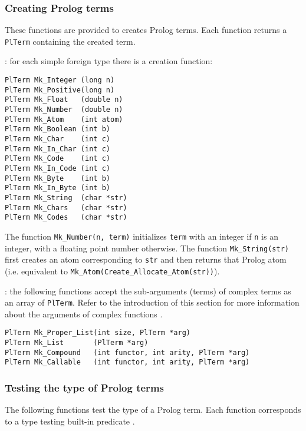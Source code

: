 \subsubsection{Creating Prolog terms}
\label{Creating-Prolog-terms}
These functions are provided to creates Prolog terms. Each function returns
a \texttt{PlTerm} containing the created term.

: for each simple foreign type
 there is a creation function:

\begin{Indentation}
\begin{verbatim}
PlTerm Mk_Integer (long n)
PlTerm Mk_Positive(long n)
PlTerm Mk_Float   (double n)
PlTerm Mk_Number  (double n)
PlTerm Mk_Atom    (int atom)
PlTerm Mk_Boolean (int b)
PlTerm Mk_Char    (int c)
PlTerm Mk_In_Char (int c)
PlTerm Mk_Code    (int c)
PlTerm Mk_In_Code (int c)
PlTerm Mk_Byte    (int b)
PlTerm Mk_In_Byte (int b)
PlTerm Mk_String  (char *str)
PlTerm Mk_Chars   (char *str)
PlTerm Mk_Codes   (char *str)
\end{verbatim}
\end{Indentation}

The function \texttt{Mk\_Number(n, term)} initializes \texttt{term} with an
integer if \texttt{n} is an integer, with a floating point number otherwise.
The function \texttt{Mk\_String(str)} first creates an atom corresponding to
\texttt{str} and then returns that Prolog atom (i.e. equivalent to
\texttt{Mk\_Atom(Create\_Allocate\_Atom(str))}).

: the following functions accept the sub-arguments
(terms) of complex terms as an array of \texttt{PlTerm}. Refer to the
introduction of this section for more information about the arguments of
complex functions .

\begin{Indentation}
\begin{verbatim}
PlTerm Mk_Proper_List(int size, PlTerm *arg)
PlTerm Mk_List       (PlTerm *arg)
PlTerm Mk_Compound   (int functor, int arity, PlTerm *arg)
PlTerm Mk_Callable   (int functor, int arity, PlTerm *arg)
\end{verbatim}
\end{Indentation}

\subsubsection{Testing the type of Prolog terms}
\label{Testing-the-type-of-Prolog-terms}
The following functions test the type of a Prolog term. Each function
corresponds to a type testing built-in predicate .

